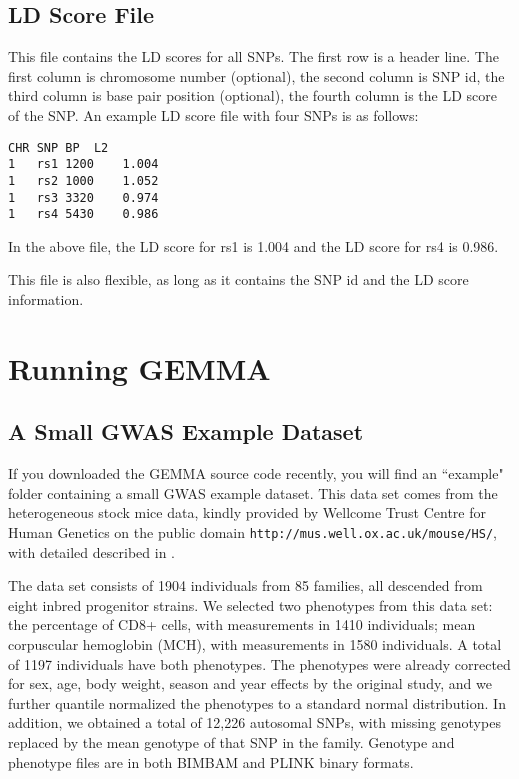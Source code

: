 \documentclass[11pt]{article}
\providecommand{\url}[1]{\texttt{#1}}
\begin{document}
\subsection{LD Score File}
This file contains the LD scores for all SNPs. The first row is a
header line. The first column is chromosome number (optional), the
second column is SNP id, the third column is base pair position
(optional), the fourth column is the LD score of the SNP. An example
LD score file with four SNPs is as follows:
%
\begin{verbatim}
CHR	SNP	BP	L2
1	rs1	1200	1.004
1	rs2	1000	1.052
1	rs3	3320	0.974
1	rs4	5430	0.986
\end{verbatim}
%
In the above file, the LD score for rs1 is 1.004 and the LD score for
rs4 is 0.986.

This file is also flexible, as long as it contains the SNP id and the
LD score information.

\newpage

\section{Running GEMMA}

\subsection{A Small GWAS Example Dataset}

If you downloaded the GEMMA source code recently, you will find an
``example" folder containing a small GWAS example dataset. This data
set comes from the heterogeneous stock mice data, kindly provided by
Wellcome Trust Centre for Human Genetics on the public domain
\url{http://mus.well.ox.ac.uk/mouse/HS/}, with detailed described in
\cite{Valdar:2006}.

The data set consists of 1904 individuals from 85 families, all
descended from eight inbred progenitor strains. We selected two
phenotypes from this data set: the percentage of CD8+ cells, with
measurements in 1410 individuals; mean corpuscular hemoglobin (MCH),
with measurements in 1580 individuals. A total of 1197 individuals
have both phenotypes. The phenotypes were already corrected for sex,
age, body weight, season and year effects by the original study, and
we further quantile normalized the phenotypes to a standard normal
distribution. In addition, we obtained a total of 12,226 autosomal
SNPs, with missing genotypes replaced by the mean genotype of that SNP
in the family. Genotype and phenotype files are in both BIMBAM and
PLINK binary formats.
\end{document}
